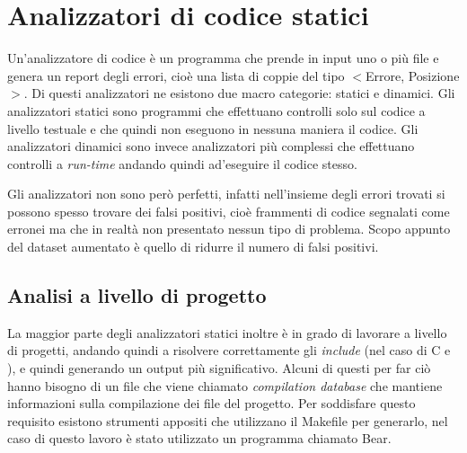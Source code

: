 

 


\section{Analizzatori di codice statici}
Un'analizzatore di codice è un programma che prende in input uno o più file e genera un report degli errori, cioè una lista di coppie del tipo $<$Errore, Posizione$>$. Di questi analizzatori ne esistono due macro categorie: statici e dinamici. 
Gli analizzatori statici sono programmi che effettuano controlli solo sul codice a livello testuale e che quindi non eseguono in nessuna maniera il codice. Gli analizzatori dinamici sono invece analizzatori più complessi che effettuano controlli a \textit{run-time}
andando quindi ad'eseguire il codice stesso.

Gli analizzatori non sono però perfetti, infatti nell'insieme degli errori trovati si possono spesso trovare dei falsi positivi, cioè frammenti di codice segnalati come erronei ma che in realtà non presentato nessun tipo di problema. Scopo appunto del dataset aumentato
è quello di ridurre il numero di falsi positivi.


\subsection{Analisi a livello di progetto} \label{subsec:compile_database}
La maggior parte degli analizzatori statici inoltre è in grado di lavorare a livello di progetti, andando quindi a risolvere correttamente gli \textit{include} (nel caso di C e \CPP), e quindi generando un output più significativo. 
Alcuni di questi per far ciò hanno bisogno di un file che viene chiamato \textit{compilation database} che mantiene informazioni sulla compilazione dei file del progetto. 
Per soddisfare questo requisito esistono strumenti appositi che utilizzano il Makefile per generarlo, nel caso di questo lavoro è stato utilizzato un programma chiamato Bear.


